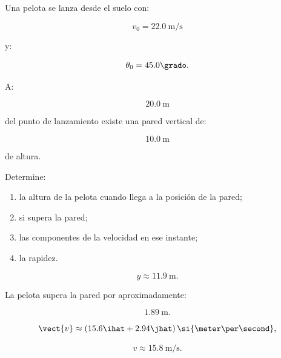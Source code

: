 \begin{ejercicio}
Una pelota se lanza desde el suelo con:

\[
v_0=\SI{22.0}{\meter\per\second}
\]

y:

\[
\theta_0=45.0\grado.
\]

A:

\[
\SI{20.0}{\meter}
\]

del punto de lanzamiento existe una pared vertical de:

\[
\SI{10.0}{\meter}
\]

de altura.

Determine:

\begin{enumerate}[label=\alph*)]
    \item la altura de la pelota cuando llega a la posición de la pared;
    \item si supera la pared;
    \item las componentes de la velocidad en ese instante;
    \item la rapidez.
\end{enumerate}
\end{ejercicio}

\begin{respuesta}
\[
y\approx\SI{11.9}{\meter}.
\]

La pelota supera la pared por aproximadamente:

\[
\SI{1.89}{\meter}.
\]

\[
\vect{v}
\approx
(15.6\ihat+2.94\jhat)
\,\si{\meter\per\second},
\]

\[
\boxed{
v\approx\SI{15.8}{\meter\per\second}
}.
\]
\end{respuesta}

